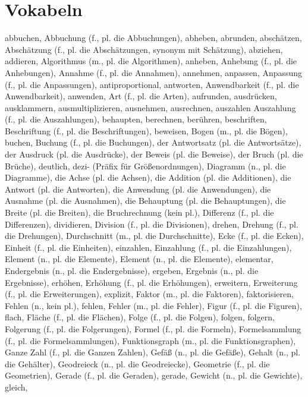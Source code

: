 \section{Vokabeln}

abbuchen,
Abbuchung (f., pl. die Abbuchungen),
abheben,
abrunden,
abschätzen,
Abschätzung (f., pl. die Abschätzungen, synonym mit Schätzung),
abziehen,
addieren,
Algorithmus (m., pl. die Algorithmen),
anheben,
Anhebung (f., pl. die Anhebungen),
Annahme (f., pl. die Annahmen),
annehmen,
anpassen,
Anpassung (f., pl. die Anpassungen),
antiproportional,
antworten,
Anwendbarkeit (f., pl. die Anwendbarkeit),
anwenden,
Art (f., pl. die Arten),
aufrunden,
ausdrücken,
ausklammern,
ausmultiplizieren,
ausnehmen,
ausrechnen,
auszahlen
Auszahlung (f., pl. die Auszahlungen),
behaupten,
berechnen,
berühren,
beschriften,
Beschriftung (f., pl. die Beschriftungen),
beweisen,
Bogen (m., pl. die Bögen),
buchen,
Buchung (f., pl. die Buchungen),
der Antwortsatz (pl. die Antwortsätze),
der Ausdruck (pl. die Ausdrücke),
der Beweis (pl. die Beweise),
der Bruch (pl. die Brüche),
deutlich,
dezi- (Präfix für Größenordnungen),
Diagramm (n., pl. die Diagramme),
die Achse (pl. die Achsen),
die Addition (pl. die Additionen),
die Antwort (pl. die Antworten),
die Anwendung (pl. die Anwendungen),
die Ausnahme (pl. die Ausnahmen),
die Behauptung (pl. die Behauptungen),
die Breite (pl. die Breiten),
die Bruchrechnung (kein pl.),
Differenz (f., pl. die Differenzen),
dividieren,
Division (f., pl. die Divisionen),
drehen,
Drehung (f., pl. die Drehungen),
Durchschnitt (m., pl. die Durchschnitte),
Ecke (f., pl. die Ecken),
Einheit (f., pl. die Einheiten),
einzahlen,
Einzahlung (f., pl. die Einzahlungen),
Element (n., pl. die Elemente),
Element (n., pl. die Elemente),
elementar,
Endergebnis (n., pl. die Endergebnisse),
ergeben,
Ergebnis (n., pl. die Ergebnisse),
erhöhen,
Erhöhung (f., pl. die Erhöhungen),
erweitern,
Erweiterung (f., pl. die Erweiterungen),
explizit,
Faktor (m., pl. die Faktoren),
faktorisieren,
Fehlen (n., kein pl.),
fehlen,
Fehler (m., pl. die Fehler),
Figur (f., pl. die Figuren),
flach,
Fläche (f., pl. die Flächen),
Folge (f., pl. die Folgen),
folgen,
folgern,
Folgerung (f., pl. die Folgerungen),
Formel (f., pl. die Formeln),
Formelsammlung (f., pl. die Formelsammlungen),
Funktionsgraph (m., pl. die Funktionsgraphen),
Ganze Zahl (f., pl. die Ganzen Zahlen),
Gefäß (n., pl. die Gefäße),
Gehalt (n., pl. die Gehälter),
Geodreieck (n., pl. die Geodreiecke),
Geometrie (f., pl. die Geometrien),
Gerade (f., pl. die Geraden),
gerade,
Gewicht (n., pl. die Gewichte),
gleich,
